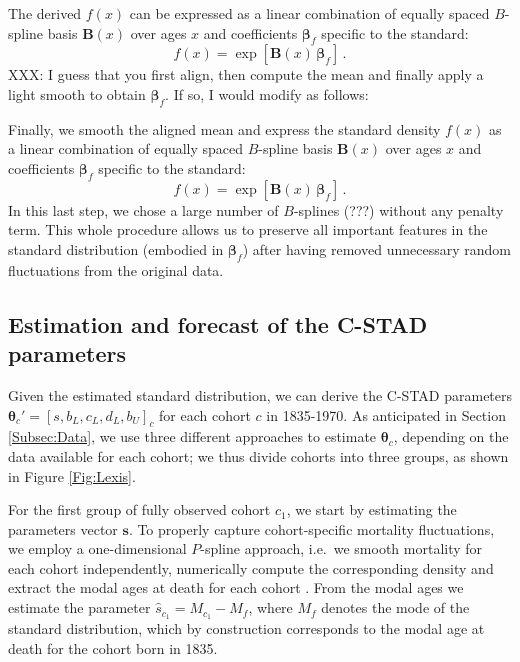 \documentclass[11pt, a4paper]{article}
\begin{document}
The derived $f(x)$ can be expressed as a linear combination of equally spaced $B$-spline basis $\bm{B}(x)$ over ages $x$ and coefficients $\bm{\beta}_{f}$ specific to the standard:
%
\begin{equation}\label{Eq:standPsplines}
f(x) = \exp\left[ \bm{B}(x) \, \bm{\beta}_{f} \right] \, .
\end{equation}
%
XXX: I guess that you first align, then compute the mean and finally apply a light smooth to obtain $\bm{\beta}_{f}$. If so, I would modify as follows:

Finally, we smooth the aligned mean and express the standard density $f(x)$ as a linear combination of equally spaced $B$-spline basis $\bm{B}(x)$ over ages $x$ and coefficients $\bm{\beta}_{f}$ specific to the standard:
%
\begin{equation}\label{Eq:standPsplines}
f(x) = \exp\left[ \bm{B}(x) \, \bm{\beta}_{f} \right] \, .
\end{equation}
In this last step, we chose a large number of $B$-splines (???) without any penalty term. This whole procedure allows us to preserve all important features in the standard distribution (embodied in $\bm{\beta}_{f}$) after having removed unnecessary random fluctuations from the original data.


\subsection{Estimation and forecast of the C-STAD parameters}
\label{Subsec:EstimForeC-STAD}
Given the estimated standard distribution, we can derive the C-STAD parameters $\bm{\theta}_{c}'=\left[s,b_{L},c_{L},d_{L},b_{U}\right]_{c}$ for each cohort $c$ in 1835-1970. As anticipated in Section \ref{Subsec:Data}, we use three different approaches to estimate $\bm{\theta}_{c}$, depending on the data available for each cohort; we thus divide cohorts into three groups, as shown in Figure \ref{Fig:Lexis}. 

For the first group of fully observed cohort $c_1$, we start by estimating the parameters vector $\bm{s}$. To properly capture cohort-specific mortality fluctuations, we employ a one-dimensional $P$-spline approach, i.e.~we smooth mortality for each cohort independently, numerically compute the corresponding density and extract the modal ages at death for each cohort \citep[for a similar approach in a period perspective see][]{ouellette2011changes}. From the modal ages we estimate the parameter $\hat{s}_{c_{1}}=M_{c_{1}} - M_f$, where $M_f$ denotes the mode of the standard distribution, which by construction corresponds to the modal age at death for the cohort born in 1835. \par
\end{document}
